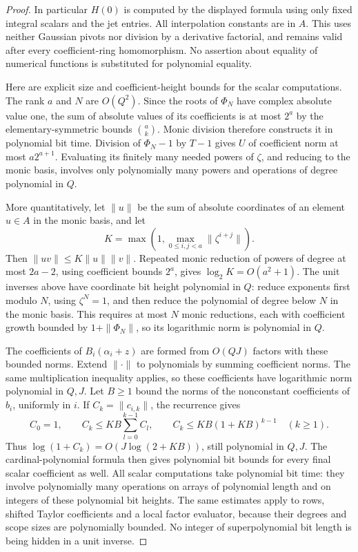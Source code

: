 \begin{proof}
In particular $H(0)$ is computed by the displayed formula using only fixed integral scalars and the jet entries. All interpolation constants are in $A$. This uses neither Gaussian pivots nor division by a derivative factorial, and remains valid after every coefficient-ring homomorphism. No assertion about equality of numerical functions is substituted for polynomial equality.

Here are explicit size and coefficient-height bounds for the scalar computations. The rank $a$ and $N$ are $O(Q^2)$. Since the roots of $\Phi_N$ have complex absolute value one, the sum of absolute values of its coefficients is at most $2^a$ by the elementary-symmetric bounds $\binom ak$. Monic division therefore constructs it in polynomial bit time. Division of $\Phi_N-1$ by $T-1$ gives $U$ of coefficient norm at most $a2^{a+1}$. Evaluating its finitely many needed powers of $\zeta$, and reducing to the monic basis, involves only polynomially many powers and operations of degree polynomial in $Q$.

More quantitatively, let $\|u\|$ be the sum of absolute coordinates of an element $u\in A$ in the monic basis, and let
\[
 K=\max\left(1,\max_{0\leq i,j<a}\|\zeta^{i+j}\|\right).
\]
Then $\|uv\|\leq K\|u\|\|v\|$. Repeated monic reduction of powers of degree at most $2a-2$, using coefficient bounds $2^a$, gives $\log_2 K=O(a^2+1)$. The unit inverses above have coordinate bit height polynomial in $Q$: reduce exponents first modulo $N$, using $\zeta^N=1$, and then reduce the polynomial of degree below $N$ in the monic basis. This requires at most $N$ monic reductions, each with coefficient growth bounded by $1+\|\Phi_N\|$, so its logarithmic norm is polynomial in $Q$.

The coefficients of $B_i(\alpha_i+z)$ are formed from $O(QJ)$ factors with these bounded norms. Extend $\|\cdot\|$ to polynomials by summing coefficient norms. The same multiplication inequality applies, so these coefficients have logarithmic norm polynomial in $Q,J$. Let $B\geq1$ bound the norms of the nonconstant coefficients of $b_i$, uniformly in $i$. If $C_k=\|c_{i,k}\|$, the recurrence gives
\[
 C_0=1,\qquad C_k\leq KB\sum_{l=0}^{k-1}C_l,
          \qquad C_k\leq KB(1+KB)^{k-1}\quad(k\geq1).
\]
Thus $\log(1+C_k)=O(J\log(2+KB))$, still polynomial in $Q,J$. The cardinal-polynomial formula then gives polynomial bit bounds for every final scalar coefficient as well. All scalar computations take polynomial bit time: they involve polynomially many operations on arrays of polynomial length and on integers of these polynomial bit heights. The same estimates apply to rows, shifted Taylor coefficients and a local factor evaluator, because their degrees and scope sizes are polynomially bounded. No integer of superpolynomial bit length is being hidden in a unit inverse.


\end{proof}
